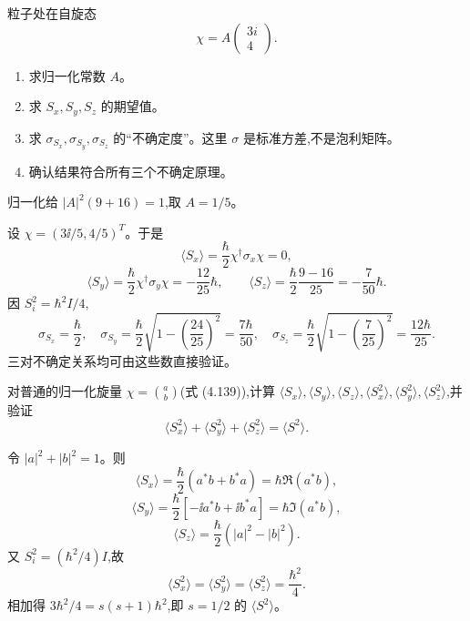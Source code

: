 \begin{question}
粒子处在自旋态
\[
\chi=A\begin{pmatrix}3i\\4\end{pmatrix}.
\]
\begin{enumerate}
\item 求归一化常数 $A$。
\item 求 $S_x,S_y,S_z$ 的期望值。
\item 求 $\sigma_{S_x},\sigma_{S_y},\sigma_{S_z}$ 的“不确定度”。这里 $\sigma$ 是标准方差,不是泡利矩阵。
\item 确认结果符合所有三个不确定原理。
\end{enumerate}
\begin{solution}

归一化给 $|A|^2(9+16)=1$,取 $A=1/5$。

设 $\chi=(3\ii/5,4/5)^T$。于是
\[
\langle S_x\rangle=\frac\hbar2\chi^\dagger\sigma_x\chi=0,
\]
\[
\langle S_y\rangle=\frac\hbar2\chi^\dagger\sigma_y\chi=-\frac{12}{25}\hbar,
\qquad
\langle S_z\rangle=\frac\hbar2\frac{9-16}{25}=-\frac{7}{50}\hbar.
\]
因 $S_i^2=\hbar^2I/4$,
\[
\sigma_{S_x}=\frac\hbar2,
\quad
\sigma_{S_y}=\frac\hbar2\sqrt{1-\left(\frac{24}{25}\right)^2}=\frac{7\hbar}{50},
\quad
\sigma_{S_z}=\frac\hbar2\sqrt{1-\left(\frac{7}{25}\right)^2}=\frac{12\hbar}{25}.
\]
三对不确定关系均可由这些数直接验证。

\end{solution}
\end{question}

\begin{question}
对普通的归一化旋量 $\chi=\binom{a}{b}$(式 (4.139)),计算 $\langle S_x\rangle,\langle S_y\rangle,\langle S_z\rangle,\langle S_x^2\rangle,\langle S_y^2\rangle,\langle S_z^2\rangle$,并验证
\[
\langle S_x^2\rangle+\langle S_y^2\rangle+\langle S_z^2\rangle=\langle S^2\rangle.
\]

\par\smallskip
{}

\begin{solution}

令 $|a|^2+|b|^2=1$。则
\[
\langle S_x\rangle=\frac\hbar2(a^*b+b^*a)=\hbar\Re(a^*b),
\]
\[
\langle S_y\rangle=\frac\hbar2[-\ii a^*b+\ii b^*a]=\hbar\Im(a^*b),
\]
\[
\langle S_z\rangle=\frac\hbar2(|a|^2-|b|^2).
\]
又 $S_i^2=(\hbar^2/4)I$,故
\[
\langle S_x^2\rangle=\langle S_y^2\rangle=\langle S_z^2\rangle=\frac{\hbar^2}{4}.
\]
相加得 $3\hbar^2/4=s(s+1)\hbar^2$,即 $s=1/2$ 的 $\langle S^2\rangle$。

\end{solution}
\end{question}

